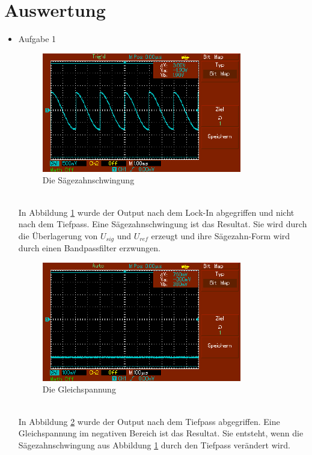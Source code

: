 \documentclass[captions=tableheading]{scrartcl}
\begin{document}
\section{Auswertung}
    \begin{itemize}
        \item{Aufgabe 1 \\}
            \begin{figure}
                \centering
                \includegraphics{Lock_In Bilder/Aufgabe 1/MAP001.pdf}
                \caption{Die Sägezahnschwingung}
                \label{fig:sawsig}
            \end{figure}
            \\
            In Abbildung \ref{fig:sawsig} wurde der Output nach dem Lock-In abgegriffen und nicht nach dem Tiefpass.
            Eine Sägezahnschwingung ist das Resultat. 
            Sie wird durch die Überlagerung von \(U_{sig}\) und \(U_{ref}\) erzeugt und ihre Sägezahn-Form wird durch einen Bandpassfilter erzwungen. 
            \begin{figure}
                \centering
                \includegraphics{Lock_In Bilder/Aufgabe 1/MAP002.pdf}
                \caption{Die Gleichspannung}
                \label{fig:flatsig}
            \end{figure}
            \\
            In Abbildung \ref{fig:flatsig} wurde der Output nach dem Tiefpass abgegriffen.
            Eine Gleichspannung im negativen Bereich ist das Resultat.
            Sie entsteht, wenn die Sägezahnschwingung aus Abbildung \ref{fig:sawsig} durch den Tiefpass verändert wird.
    \end{itemize}
\end{document}
